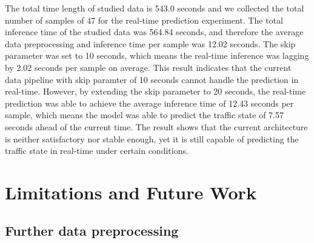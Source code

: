 \documentclass[11pt]{uonthesis}
\begin{document}
The total time length of studied data is 543.0 seconds and we collected the total number of samples of 47 for the real-time prediction experiment. The total inference time of the studied data was 564.84 seconds, and therefore the average data preprocessing and inference time per sample was 12.02 seconds. The skip parameter was set to 10 seconds, which means the real-time inference was lagging by 2.02 seconds per sample on average. This result indicates that the current data pipeline with skip paramter of 10 seconds cannot handle the prediction in real-time. However, by extending the skip parameter to 20 seconds, the real-time prediction was able to achieve the average inference time of 12.43 seconds per sample, which means the model was able to predict the traffic state of 7.57 seconds ahead of the current time. The result shows that the current architecture is neither satisfactory nor stable enough, yet it is still capable of predicting the traffic state in real-time under certain conditions. %

\chapter{Limitations and Future Work}

\section{Further data preprocessing}
\end{document}
